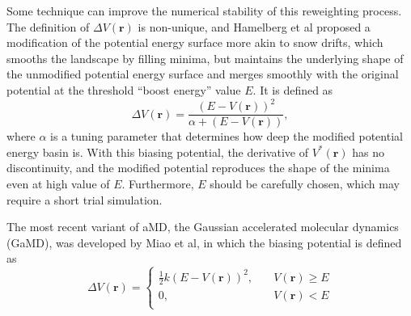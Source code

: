 Some technique can improve the numerical stability of this reweighting process.\cite{MiaoJCTC2014} The definition of $\Delta V(\mathbf{r})$ is non-unique, and Hamelberg et al proposed a modification of the potential energy surface more akin to snow drifts, which smooths the landscape by filling minima, but maintains the underlying shape of the unmodified potential energy surface and merges smoothly with the original potential at the threshold ``boost energy'' value $E$. It is defined as
\begin{equation}
	\Delta V(\mathbf{r})=\frac{(E-V(\mathbf{r}))^2}{\alpha+(E-V(\mathbf{r}))},
\end{equation}
where $\alpha$ is a tuning parameter that determines how deep the modified potential energy basin is. With this biasing potential, the derivative of $V^{\ast}(\mathbf{r})$ has no discontinuity, and the modified potential reproduces the shape of the minima even at high value of $E$. Furthermore, $E$ should be carefully chosen, which may require a short trial simulation.

The most recent variant of aMD, the Gaussian accelerated molecular dynamics (GaMD), was developed by Miao et al\cite{MiaoJCTC2015}, in which the biasing potential is defined as
\begin{equation}
	\Delta V(\mathbf{r})= 
	\left\{ 
	\begin{array}{rl} 
		\frac{1}{2}k(E-V(\mathbf{r}))^2, &\quad V(\mathbf{r})\geq E\\ 
		0, &\quad V(\mathbf{r})< E\\  
	\end{array} 
	\right.
\end{equation}

